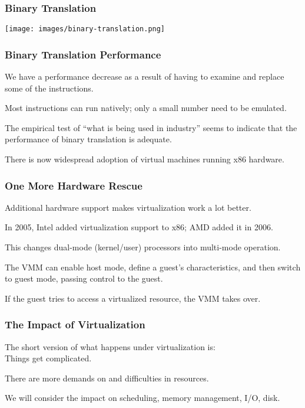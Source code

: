 \begin{frame}
\frametitle{Binary Translation}

\begin{center}
	\texttt{[image: images/binary-translation.png]}
\end{center}


\end{frame}

\begin{frame}
\frametitle{Binary Translation Performance}

We have a performance decrease as a result of having to examine and replace some of the instructions. 

Most instructions can run natively; only a small number need to be emulated. 

The empirical test of ``what is being used in industry'' seems to indicate that the performance of binary translation is adequate. 

There is now widespread adoption of virtual machines running x86 hardware.


\end{frame}

\begin{frame}
\frametitle{One More Hardware Rescue}

Additional hardware support makes virtualization work a lot better.

In 2005, Intel added virtualization support to x86; AMD added it in 2006. 

This changes dual-mode (kernel/user) processors into multi-mode operation. 

The VMM can enable host mode, define a guest's characteristics, and then switch to guest mode, passing control to the guest. 

If the guest tries to access a virtualized resource, the VMM takes over.


\end{frame}

\begin{frame}
\frametitle{The Impact of Virtualization}

The short version of what happens under virtualization is:\\
\quad Things get complicated. 

There are more demands on and difficulties in resources. 

We will consider the impact on scheduling, memory management, I/O, disk.

\end{frame}

